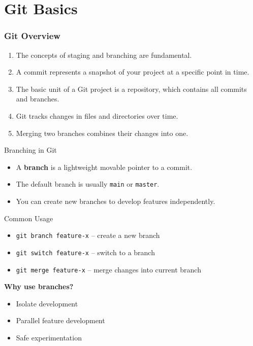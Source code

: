 \documentclass[12pt]{beamer}
\begin{document}
\section{Git Basics}

\begin{frame}
  \frametitle{Git Overview}
  \begin{enumerate}
    \setlength\itemsep{1em}
    \item The concepts of staging and branching are fundamental.
    \item A commit represents a snapshot of your project at a specific point in time.
    \item The basic unit of a Git project is a repository, which contains all commits and branches.
    \item Git tracks changes in files and directories over time.
    \item Merging two branches combines their changes into one.
  \end{enumerate}
\end{frame}



\begin{frame}{Branching in Git}
  \begin{itemize}
      \item A \textbf{branch} is a lightweight movable pointer to a commit.
      \item The default branch is usually \texttt{main} or \texttt{master}.
      \item You can create new branches to develop features independently.
  \end{itemize}
  \pause
  \begin{block}{Common Usage}
  \begin{itemize}
      \item \texttt{git branch feature-x} – create a new branch
      \item \texttt{git switch feature-x} – switch to a branch
      \item \texttt{git merge feature-x} – merge changes into current branch
  \end{itemize}
  \end{block}
  \pause
  \textbf{Why use branches?}
  \begin{itemize}
      \item Isolate development
      \item Parallel feature development
      \item Safe experimentation
  \end{itemize}
\end{frame}
\end{document}
